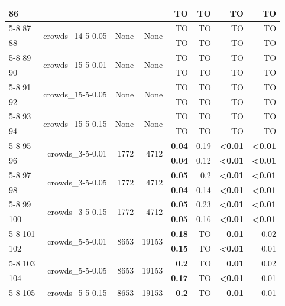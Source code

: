 \begin{longtable}{lrr@{\hskip 12pt}r@{\hskip 12pt}r@{\hskip 12pt}r@{\hskip 12pt}r@{\hskip 12pt}r}
86 &  &  &  & TO & TO & TO & TO \\
\cmidrule{5-8}
87 & \multirow{2}{*}{crowds\_14-5-0.05} & \multirow{2}{*}{None} & \multirow{2}{*}{None} & TO & TO & TO & TO \\
88 &  &  &  & TO & TO & TO & TO \\
\cmidrule{5-8}
89 & \multirow{2}{*}{crowds\_15-5-0.01} & \multirow{2}{*}{None} & \multirow{2}{*}{None} & TO & TO & TO & TO \\
90 &  &  &  & TO & TO & TO & TO \\
\cmidrule{5-8}
91 & \multirow{2}{*}{crowds\_15-5-0.05} & \multirow{2}{*}{None} & \multirow{2}{*}{None} & TO & TO & TO & TO \\
92 &  &  &  & TO & TO & TO & TO \\
\cmidrule{5-8}
93 & \multirow{2}{*}{crowds\_15-5-0.15} & \multirow{2}{*}{None} & \multirow{2}{*}{None} & TO & TO & TO & TO \\
94 &  &  &  & TO & TO & TO & TO \\
\cmidrule{5-8}
95 & \multirow{2}{*}{crowds\_3-5-0.01} & \multirow{2}{*}{1772} & \multirow{2}{*}{4712} & \textbf{0.04} & 0.19 & \textbf{<0.01} & \textbf{<0.01} \\
96 &  &  &  & \textbf{0.04} & 0.12 & \textbf{<0.01} & \textbf{<0.01} \\
\cmidrule{5-8}
97 & \multirow{2}{*}{crowds\_3-5-0.05} & \multirow{2}{*}{1772} & \multirow{2}{*}{4712} & \textbf{0.05} & 0.2 & \textbf{<0.01} & \textbf{<0.01} \\
98 &  &  &  & \textbf{0.04} & 0.14 & \textbf{<0.01} & \textbf{<0.01} \\
\cmidrule{5-8}
99 & \multirow{2}{*}{crowds\_3-5-0.15} & \multirow{2}{*}{1772} & \multirow{2}{*}{4712} & \textbf{0.05} & 0.23 & \textbf{<0.01} & \textbf{<0.01} \\
100 &  &  &  & \textbf{0.05} & 0.16 & \textbf{<0.01} & \textbf{<0.01} \\
\cmidrule{5-8}
101 & \multirow{2}{*}{crowds\_5-5-0.01} & \multirow{2}{*}{8653} & \multirow{2}{*}{19153} & \textbf{0.18} & TO & \textbf{0.01} & 0.02 \\
102 &  &  &  & \textbf{0.15} & TO & \textbf{<0.01} & 0.01 \\
\cmidrule{5-8}
103 & \multirow{2}{*}{crowds\_5-5-0.05} & \multirow{2}{*}{8653} & \multirow{2}{*}{19153} & \textbf{0.2} & TO & \textbf{0.01} & 0.02 \\
104 &  &  &  & \textbf{0.17} & TO & \textbf{<0.01} & 0.01 \\
\cmidrule{5-8}
105 & \multirow{2}{*}{crowds\_5-5-0.15} & \multirow{2}{*}{8653} & \multirow{2}{*}{19153} & \textbf{0.2} & TO & \textbf{0.01} & 0.01 \\

\end{longtable}
